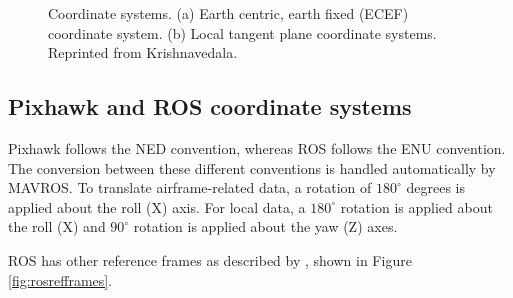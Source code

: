 \begin{figure}%
	\centering
	\caption[ECEF coordinate system]{\small Coordinate systems. (a) Earth centric, earth fixed (ECEF) coordinate system. (b) Local tangent plane coordinate systems. Reprinted from Krishnavedala. 
	}%
	\label{fig:coordinatesystem}%
\end{figure}

\subsection{Pixhawk and ROS coordinate systems}

Pixhawk follows the NED convention, whereas ROS follows the ENU convention. The conversion between these different conventions is handled automatically by MAVROS. To translate airframe-related data, a rotation of $180^{\circ}$ degrees is applied about the roll (X) axis. For local data, a $180^{\circ}$ rotation is applied about the roll (X) and $90^{\circ}$ rotation is applied about the yaw (Z) axes.

ROS has other reference frames as described by , shown in Figure \ref{fig:rosrefframes}.


